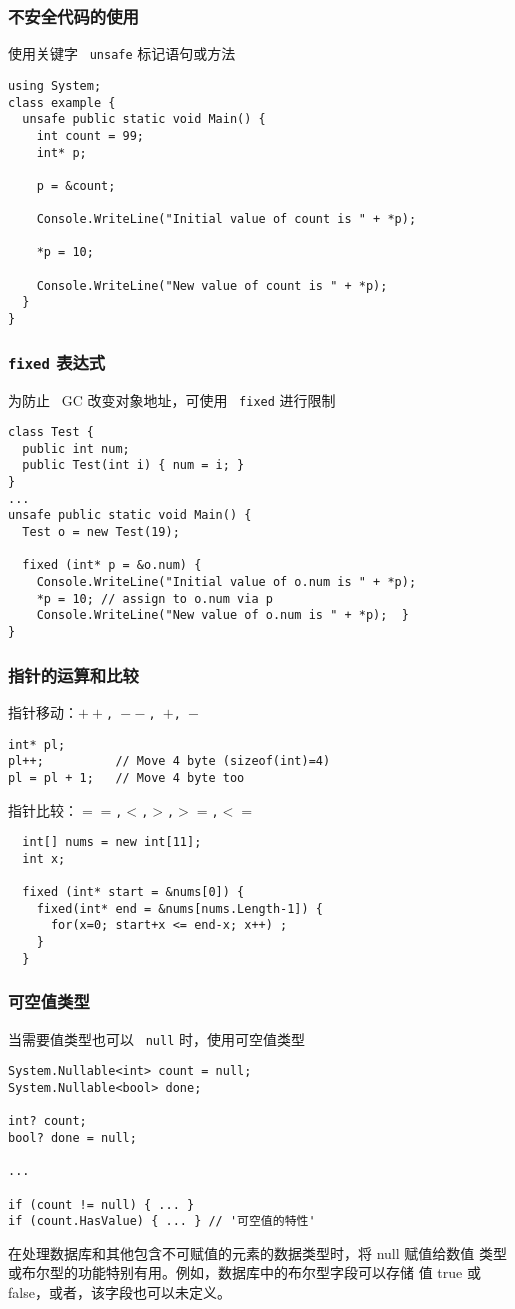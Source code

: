 \begin{frame}[fragile]
\frametitle{不安全代码的使用}
使用关键字 ~\texttt{unsafe} 标记语句或方法
\begin{lstlisting}
using System;
class example {
  unsafe public static void Main() {
    int count = 99;
    int* p;

    p = &count;

    Console.WriteLine("Initial value of count is " + *p);

    *p = 10;

    Console.WriteLine("New value of count is " + *p);
  }
}
\end{lstlisting}
\end{frame}

\begin{frame}[fragile]
\frametitle{\texttt{fixed} 表达式}
为防止 ~GC 改变对象地址，可使用 ~\texttt{fixed} 进行限制
\begin{lstlisting}
class Test {
  public int num;
  public Test(int i) { num = i; }
}
...
unsafe public static void Main() {
  Test o = new Test(19);

  fixed (int* p = &o.num) {
    Console.WriteLine("Initial value of o.num is " + *p);
    *p = 10; // assign to o.num via p
    Console.WriteLine("New value of o.num is " + *p);  }
}
\end{lstlisting}
\end{frame}

\begin{frame}[fragile]
\frametitle{指针的运算和比较}
指针移动：\texttt{$++$, $--$, $+$, $-$}
\begin{lstlisting}
int* pl;
pl++;          // Move 4 byte (sizeof(int)=4)
pl = pl + 1;   // Move 4 byte too
\end{lstlisting}
\pause
指针比较：\texttt{$==$,$<$,$>$,$>=$,$<=$}
\begin{lstlisting}
  int[] nums = new int[11];
  int x;

  fixed (int* start = &nums[0]) {
    fixed(int* end = &nums[nums.Length-1]) {
      for(x=0; start+x <= end-x; x++) ;
    }
  }

\end{lstlisting}
\end{frame}

\begin{frame}[fragile]
\frametitle{可空值类型}
当需要值类型也可以 ~\texttt{null} 时，使用可空值类型

\begin{lstlisting}[escapeinside='']
System.Nullable<int> count = null;
System.Nullable<bool> done;

int? count;
bool? done = null;

...

if (count != null) { ... }
if (count.HasValue) { ... } // '可空值的特性'
\end{lstlisting}

\CJKindent 在处理数据库和其他包含不可赋值的元素的数据类型时，将 null 赋值给数值
类型或布尔型的功能特别有用。例如，数据库中的布尔型字段可以存储
值 true 或 false，或者，该字段也可以未定义。
\end{frame}

